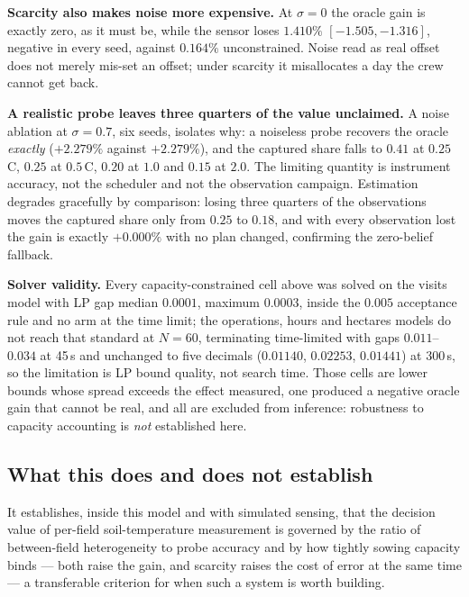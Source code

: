 \textbf{Scarcity also makes noise more expensive.} At $\sigma=0$ the oracle
gain is exactly zero, as it must be, while the sensor loses $1.410\%$
$[-1.505,-1.316]$, negative in every seed, against $0.164\%$ unconstrained.
Noise read as real offset does not merely mis-set an offset; under scarcity
it misallocates a day the crew cannot get back.

\textbf{A realistic probe leaves three quarters of the value unclaimed.} A
noise ablation at $\sigma = 0.7$, six seeds, isolates why: a noiseless probe
recovers the oracle \emph{exactly} ($+2.279\%$ against $+2.279\%$), and the
captured share falls to $0.41$ at $0.25$\,\textdegree C, $0.25$ at
$0.5$\,\textdegree C, $0.20$ at $1.0$ and $0.15$ at $2.0$. The limiting
quantity is instrument accuracy, not the scheduler and not the observation
campaign. Estimation degrades gracefully by comparison: losing three
quarters of the observations moves the captured share only from $0.25$ to
$0.18$, and with every observation lost the gain is exactly $+0.000\%$ with
no plan changed, confirming the zero-belief fallback.



\textbf{Solver validity.} Every capacity-constrained cell above was solved
on the visits model with LP gap median $0.0001$, maximum $0.0003$, inside
the $0.005$ acceptance rule and no arm at the time limit; the operations,
hours and hectares models do not reach that standard at $N=60$, terminating
time-limited with gaps $0.011$--$0.034$ at 45\,s and unchanged to five
decimals ($0.01140$, $0.02253$, $0.01441$) at $300$\,s, so the limitation is
LP bound quality, not search time. Those cells are lower bounds whose spread
exceeds the effect measured, one produced a negative oracle gain that cannot
be real, and all are excluded from inference: robustness to capacity
accounting is \emph{not} established here.

\subsection{What this does and does not establish}

It establishes, inside this model and with simulated sensing, that the
decision value of per-field soil-temperature measurement is governed by the
ratio of between-field heterogeneity to probe accuracy and by how tightly
sowing capacity binds --- both raise the gain, and scarcity raises the cost
of error at the same time --- a transferable criterion for when such a
system is worth building.

